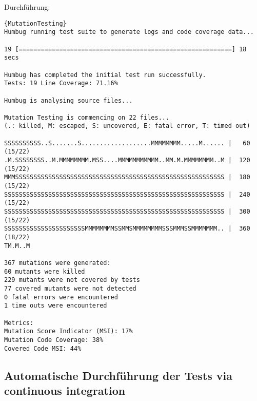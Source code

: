 Durchführung:
\begin{lstlisting}[caption=Ausführung des Mutation-Testing]{MutationTesting}
Humbug running test suite to generate logs and code coverage data...

19 [==========================================================] 18 secs

Humbug has completed the initial test run successfully.
Tests: 19 Line Coverage: 71.16%

Humbug is analysing source files...

Mutation Testing is commencing on 22 files...
(.: killed, M: escaped, S: uncovered, E: fatal error, T: timed out)

SSSSSSSSSS..S.......S...................MMMMMMMM.....M...... |   60 (15/22)
.M.SSSSSSSS..M.MMMMMMMM.MSS....MMMMMMMMMMM..MM.M.MMMMMMMM..M |  120 (15/22)
MMMSSSSSSSSSSSSSSSSSSSSSSSSSSSSSSSSSSSSSSSSSSSSSSSSSSSSSSSSS |  180 (15/22)
SSSSSSSSSSSSSSSSSSSSSSSSSSSSSSSSSSSSSSSSSSSSSSSSSSSSSSSSSSSS |  240 (15/22)
SSSSSSSSSSSSSSSSSSSSSSSSSSSSSSSSSSSSSSSSSSSSSSSSSSSSSSSSSSSS |  300 (15/22)
SSSSSSSSSSSSSSSSSSSSSSMMMMMMMMSSMMSMMMMMMMMSSSMMMSSMMMMMMM.. |  360 (18/22)
TM.M..M

367 mutations were generated:
60 mutants were killed
229 mutants were not covered by tests
77 covered mutants were not detected
0 fatal errors were encountered
1 time outs were encountered

Metrics:
Mutation Score Indicator (MSI): 17%
Mutation Code Coverage: 38%
Covered Code MSI: 44%
\end{lstlisting}



\subsection{Automatische Durchführung der Tests via continuous integration}